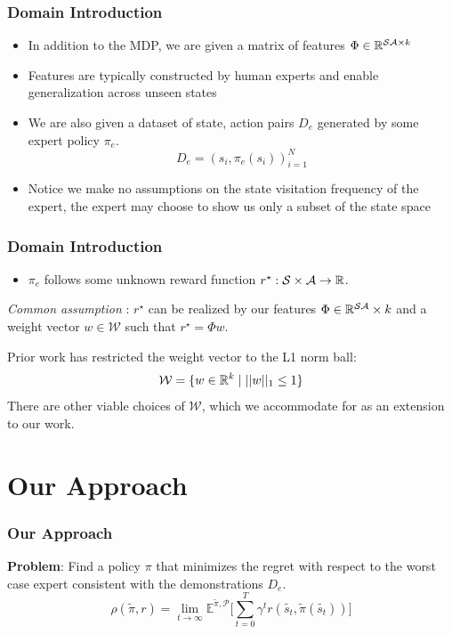 \documentclass{beamer}
\begin{document}
\begin{frame}
	\frametitle{Domain Introduction}
	\begin{itemize}
		\item In addition to the MDP, we are given a matrix of features $\Phi \in \mathbb{R}^{\mathcal{S}\mathcal{A} \times k}$
		\item Features are typically constructed by human experts and enable generalization across unseen states
		\item We are also given a dataset of state, action pairs $D_e$ generated by some expert policy $\pi_e$. \[ D_e = (s_i, \pi_e(s_i))_{i=1}^N \]
		\item Notice we make no assumptions on the state visitation frequency of the expert,
			the expert may choose to show us only a subset of the state space
	\end{itemize}
\end{frame}

\begin{frame}
	\frametitle{Domain Introduction}
\begin{itemize}
	\item $\pi_e$ follows some unknown reward function $r^\star : \mathcal{S} \times \mathcal{A} \to \mathbb{R}$.
\end{itemize}
	\emph{Common assumption} : $r^\star$ can be realized by our features $\Phi \in \mathbb{R}^{\mathcal{S}\mathcal{A}} \times k$
	and a weight vector $w \in \mathcal{W}$ such that $r^\star = \Phi w$.

	Prior work has restricted the weight vector to the L1 norm ball:
	\[ \mathcal{W} = \lbrace w \in \mathbb{R}^k \mid \lvert \lvert w \rvert \rvert_1 \leq 1 \rbrace \]
	There are other viable choices of $\mathcal{W}$, which we accommodate for as an extension to our work.
\end{frame}


\section*{Our Approach}

\begin{frame}
	\frametitle{Our Approach}
	\textbf{Problem}: Find a policy $\pi$ that minimizes the regret with respect to the worst case expert consistent with the demonstrations $D_e$.
	\[ \rho(\tilde{\pi}, r) = \lim_{t \to \infty} \mathbb{E}^{\tilde{\pi}, \mathcal{P}} \lbrack \sum_{t=0}^T \gamma^t r(\tilde{s_t}, \tilde{\pi}(\tilde{s_t})) \rbrack \]
\end{frame}
\end{document}
